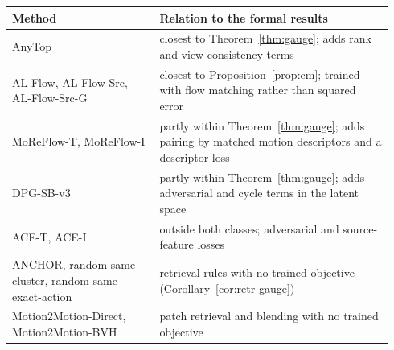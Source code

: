 \begin{tabular}{p{0.36\linewidth}p{0.58\linewidth}}
\toprule
Method & Relation to the formal results \\
\midrule
AnyTop & closest to Theorem~\ref{thm:gauge}; adds rank and view-consistency terms \\
AL-Flow, AL-Flow-Src, AL-Flow-Src-G & closest to Proposition~\ref{prop:cm}; trained with flow matching rather than squared error \\
MoReFlow-T, MoReFlow-I & partly within Theorem~\ref{thm:gauge}; adds pairing by matched motion descriptors and a descriptor loss \\
DPG-SB-v3 & partly within Theorem~\ref{thm:gauge}; adds adversarial and cycle terms in the latent space \\
ACE-T, ACE-I & outside both classes; adversarial and source-feature losses \\
ANCHOR, random-same-cluster, random-same-exact-action & retrieval rules with no trained objective (Corollary~\ref{cor:retr-gauge}) \\
Motion2Motion-Direct, Motion2Motion-BVH & patch retrieval and blending with no trained objective \\
\bottomrule
\end{tabular}
